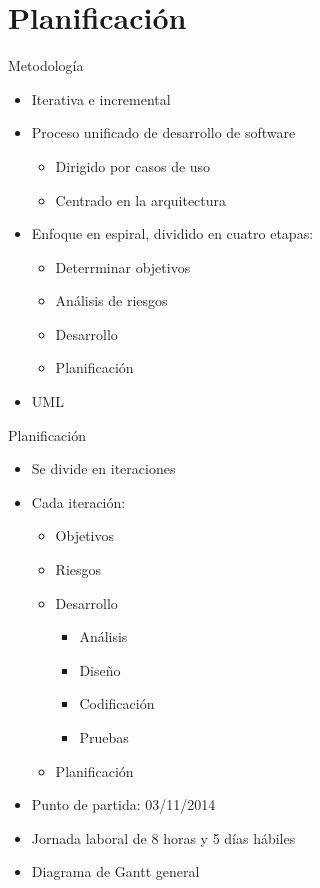 \documentclass[spanish]{beamer}
\begin{document}
\section{Planificación}
\begin{frame}{Metodología}
    \begin{itemize}
      \item Iterativa e incremental
      \item Proceso unificado de desarrollo de software 
      \begin {itemize}
         \item Dirigido por casos de uso 
         \item Centrado en la arquitectura
      \end{itemize}
      \item Enfoque en espiral, dividido en cuatro etapas:
      \begin {itemize}
         \item Deterrminar objetivos
         \item Análisis de riesgos
         \item Desarrollo
         \item Planificación
      \end{itemize}
      \item UML
   \end{itemize}
\end{frame}

\begin{frame}{Planificación}
    \begin{itemize}
      \item Se divide en iteraciones
      \item Cada iteración:
      \begin {itemize}
         \item Objetivos
         \item Riesgos
         \item Desarrollo
         \begin{itemize}
         \item Análisis
         \item Diseño
         \item Codificación
         \item Pruebas
         \end{itemize}
         \item Planificación
      \end{itemize}
      \item Punto de partida: 03/11/2014
      \item Jornada laboral de 8 horas y 5 días hábiles
      \item Diagrama de Gantt general
   \end{itemize}
\end{frame}
\end{document}
